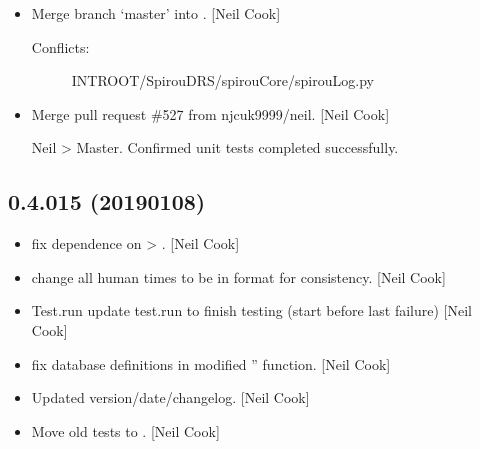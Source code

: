 \documentclass[a4paper,10pt,english]{report}
\begin{document}
\begin{itemize}
\item {} 
Merge branch ‘master’ into . {[}Neil Cook{]}
\begin{description}
\item[{Conflicts:}] \leavevmode
INTROOT/SpirouDRS/spirouCore/spirouLog.py

\end{description}

\item {} 
Merge pull request \#527 from njcuk9999/neil. {[}Neil Cook{]}

Neil \textendash{}\textgreater{} Master. Confirmed unit tests completed successfully.

\end{itemize}


\subsection{0.4.015 (2019\sphinxhyphen{}01\sphinxhyphen{}08)}
\label{\detokenize{misc/changelog:id240}}\begin{itemize}
\item {} 
 \sphinxhyphen{} fix dependence on  \textendash{}\textgreater{} .
{[}Neil Cook{]}

\item {} 
 \sphinxhyphen{} change all human times to be in format
 for consistency. {[}Neil Cook{]}

\item {} 
Test.run \sphinxhyphen{} update test.run to finish testing (start before last
failure) {[}Neil Cook{]}

\item {} 
 \sphinxhyphen{} fix database definitions in modified ”
function. {[}Neil Cook{]}

\item {} 
Updated version/date/changelog. {[}Neil Cook{]}

\item {} 
Move old tests to . {[}Neil Cook{]}

\end{itemize}
\end{document}
